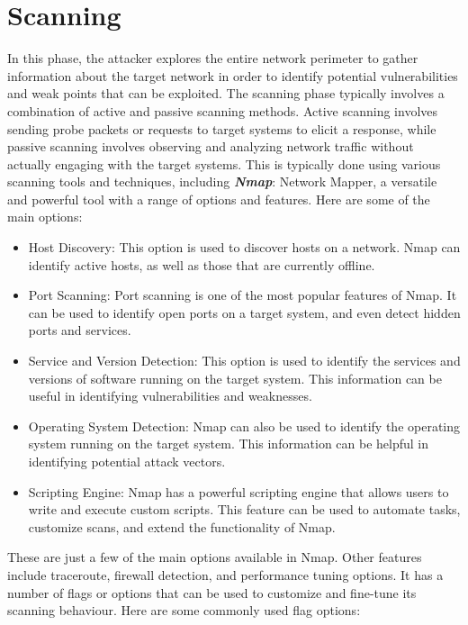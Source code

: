 \documentclass[a4paper, 12pt, oneside]{extbook}
\begin{document}
\chapter{Scanning}
In this phase, the attacker explores the entire network perimeter to gather information about 
the target network in order to identify potential vulnerabilities and weak points that can be exploited.  
\newline The scanning phase typically involves a combination of active and passive scanning methods. Active scanning involves 
sending probe packets or requests to target systems to elicit a response, while passive scanning involves observing and analyzing network traffic without actually engaging with the target systems. 
This is typically done using various scanning tools and techniques, including \textbf{\textit{Nmap}}: Network Mapper, a versatile and powerful tool with a range of options and features. 
Here are some of the main options:
\begin{itemize}
  \item Host Discovery: This option is used to discover hosts on a network. Nmap can identify active hosts, as well as those that are currently offline.
  \item Port Scanning: Port scanning is one of the most popular features of Nmap. It can be used to identify open ports on a target system, and even detect hidden ports and services.
  \item Service and Version Detection: This option is used to identify the services and versions of software running on the target system. This information can be useful in identifying vulnerabilities and weaknesses.
  \item Operating System Detection: Nmap can also be used to identify the operating system running on the target system. This information can be helpful in identifying potential attack vectors.
  \item Scripting Engine: Nmap has a powerful scripting engine that allows users to write and execute custom scripts. This feature can be used to automate tasks, customize scans, and extend the functionality of Nmap.
\end{itemize} 
These are just a few of the main options available in Nmap. Other features include traceroute, firewall detection, and performance tuning options.
It has a number of flags or options that can be used to customize and fine-tune its scanning behaviour.
\newline Here are some commonly used flag options:
\end{document}
